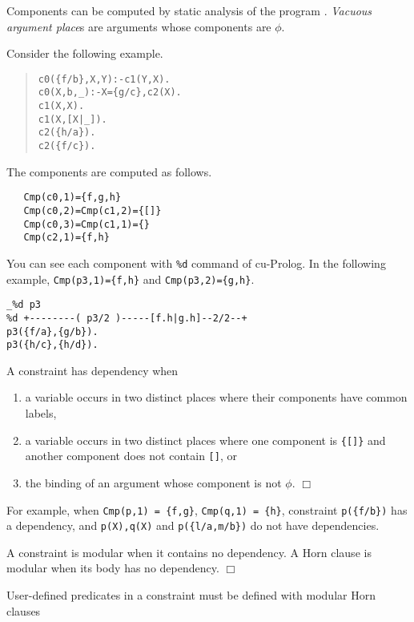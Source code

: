 Components can be computed by static analysis of the program
\cite{tuda:sof91}.
{\em Vacuous argument place}s\cite{tuda:sico} 
are arguments whose components are $\phi$.

Consider the following example.
\begin{quote}
\begin{verbatim}
c0({f/b},X,Y):-c1(Y,X).
c0(X,b,_):-X={g/c},c2(X).
c1(X,X).
c1(X,[X|_]).
c2({h/a}).
c2({f/c}).
\end{verbatim}
\end{quote}
The components are computed as follows.
\begin{verbatim}
   Cmp(c0,1)={f,g,h} 
   Cmp(c0,2)=Cmp(c1,2)={[]} 
   Cmp(c0,3)=Cmp(c1,1)={}
   Cmp(c2,1)={f,h}
\end{verbatim}

You can see each component with {\tt \%d} command of cu-Prolog.
In the following example, 
{\tt Cmp(p3,1)=\{f,h\}} and {\tt Cmp(p3,2)=\{g,h\}}.

\begin{verbatim}
_%d p3
%d +--------( p3/2 )-----[f.h|g.h]--2/2--+
p3({f/a},{g/b}).
p3({h/c},{h/d}).
\end{verbatim}

\begin{defs}[dependency]
A constraint has {\sf dependency} when
\begin{enumerate}
\item a variable occurs in two distinct places where their
components have common labels, 
\item a variable occurs in two distinct places where one component is
\verb!{[]}! and another component does not contain \verb![]!, or
\item the binding of an argument whose component is not $\phi$. 
\hfill $\Box$
\end{enumerate}
\end{defs}

For example, when {\tt Cmp(p,1) = \{f,g\}}, 
{\tt Cmp(q,1) = \{h\}}, 
constraint {\tt p(\{f/b\})} has a dependency, and 
{\tt p(X),q(X)} and  
{\tt p(\{l/a,m/b\})} do not have dependencies.

\begin{defs}
A constraint is {\sf modular} when it
contains no dependency.
A Horn clause is {\sf modular} when its body has no dependency.
\hfill $\Box$
\end{defs}

User-defined predicates in a constraint must be defined with modular
Horn clauses

